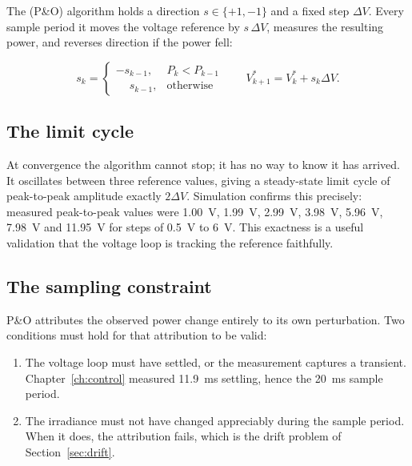 The  (P\&O) algorithm holds a direction $s \in \{+1,
-1\}$ and a fixed step $\Delta V$. Every sample period it moves the voltage
reference by $s\,\Delta V$, measures the resulting power, and reverses direction
if the power fell:

\begin{equation}
s_{k} = \begin{cases} -s_{k-1}, & P_k < P_{k-1} \\ \phantom{-}s_{k-1}, & \text{otherwise}\end{cases}
\qquad
V^\ast_{k+1} = V^\ast_k + s_k \Delta V .
\end{equation}

\subsection{The limit cycle}

At convergence the algorithm cannot stop; it has no way to know it has arrived.
It oscillates between three reference values, giving a steady-state limit cycle
of peak-to-peak amplitude exactly $2\Delta V$. Simulation confirms this
precisely: measured peak-to-peak values were \SI{1.00}{\volt},
\SI{1.99}{\volt}, \SI{2.99}{\volt}, \SI{3.98}{\volt}, \SI{5.96}{\volt},
\SI{7.98}{\volt} and \SI{11.95}{\volt} for steps of \SI{0.5}{\volt} to
\SI{6}{\volt}. This exactness is a useful validation that the voltage loop is
tracking the reference faithfully.

\subsection{The sampling constraint}

P\&O attributes the observed power change entirely to its own perturbation. Two
conditions must hold for that attribution to be valid:

\begin{enumerate}[leftmargin=1.6em]
  \item The voltage loop must have settled, or the measurement captures a
        transient. Chapter~\ref{ch:control} measured \SI{11.9}{\milli\second}
        settling, hence the \SI{20}{\milli\second} sample period.
  \item The irradiance must not have changed appreciably during the sample
        period. When it does, the attribution fails, which is the drift problem
        of Section~\ref{sec:drift}.
\end{enumerate}

